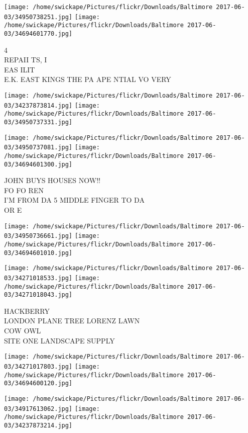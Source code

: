 \documentclass[10pt,letterpaper]{article}
\begin{document}
\texttt{[image: /home/swickape/Pictures/flickr/Downloads/Baltimore 2017-06-03/34950738251.jpg]}
\texttt{[image: /home/swickape/Pictures/flickr/Downloads/Baltimore 2017-06-03/34694601770.jpg]}

4\\
REPAII TS, I\\
EAS ILIT\\
E.K. EAST KINGS THE PA APE NTIAL VO VERY\\
\pagebreak

\texttt{[image: /home/swickape/Pictures/flickr/Downloads/Baltimore 2017-06-03/34237873814.jpg]}
\texttt{[image: /home/swickape/Pictures/flickr/Downloads/Baltimore 2017-06-03/34950737331.jpg]}

\texttt{[image: /home/swickape/Pictures/flickr/Downloads/Baltimore 2017-06-03/34950737081.jpg]}
\texttt{[image: /home/swickape/Pictures/flickr/Downloads/Baltimore 2017-06-03/34694601300.jpg]}

JOHN BUYS HOUSES NOW!!\\
FO FO REN\\
I'M FROM DA 5 MIDDLE FINGER TO DA\\
OR E\\
\pagebreak

\texttt{[image: /home/swickape/Pictures/flickr/Downloads/Baltimore 2017-06-03/34950736661.jpg]}
\texttt{[image: /home/swickape/Pictures/flickr/Downloads/Baltimore 2017-06-03/34694601010.jpg]}

\texttt{[image: /home/swickape/Pictures/flickr/Downloads/Baltimore 2017-06-03/34271018533.jpg]}
\texttt{[image: /home/swickape/Pictures/flickr/Downloads/Baltimore 2017-06-03/34271018043.jpg]}

HACKBERRY\\
LONDON PLANE TREE LORENZ LAWN\\
COW OWL\\
SITE ONE LANDSCAPE SUPPLY\\
\pagebreak

\texttt{[image: /home/swickape/Pictures/flickr/Downloads/Baltimore 2017-06-03/34271017803.jpg]}
\texttt{[image: /home/swickape/Pictures/flickr/Downloads/Baltimore 2017-06-03/34694600120.jpg]}

\texttt{[image: /home/swickape/Pictures/flickr/Downloads/Baltimore 2017-06-03/34917613062.jpg]}
\texttt{[image: /home/swickape/Pictures/flickr/Downloads/Baltimore 2017-06-03/34237873214.jpg]}
\end{document}
